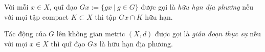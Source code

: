 \begin{defn}
    Với mỗi $x\in X$, quĩ đạo $Gx:= \{gx~|~g\in G\}$ được gọi là \textit{hữu hạn địa phương} nếu với mọi tập compact $K \subset X$ thì tập $Gx \cap K $ hữu hạn.
\end{defn}
\begin{defn}
    Tác động của $G$ lên không gian metric $(X,d)$ được gọi là \textit{gián đoạn thực sự} nếu với mọi $x \in X$  thì quĩ đạo $Gx$ là hữu hạn địa phương.
\end{defn}
    

